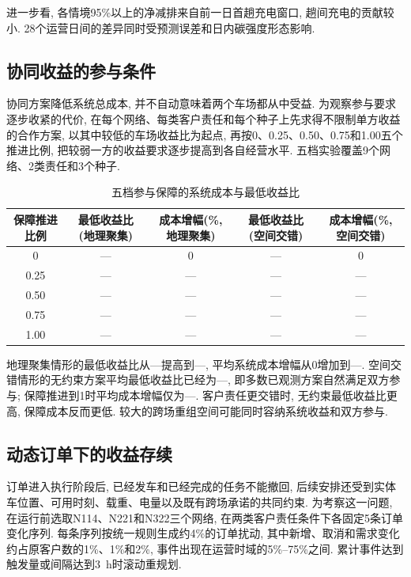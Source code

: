\documentclass{setp-new}
\newcommand{\setptabsetup}{\fontsize{9pt}{10.5pt}\selectfont\renewcommand{\arraystretch}{0.90}\setlength{\tabcolsep}{2.2pt}\setlength{\aboverulesep}{0.4pt}\setlength{\belowrulesep}{0.4pt}\hbadness=10000}
\begin{document}
进一步看, 各情境95\%以上的净减排来自前一日首趟充电窗口,
趟间充电的贡献较小.
28个运营日间的差异同时受预测误差和日内碳强度形态影响.

\subsection{协同收益的参与条件}

协同方案降低系统总成本, 并不自动意味着两个车场都从中受益.
为观察参与要求逐步收紧的代价,
在每个网络、每类客户责任和每个种子上先求得不限制单方收益的合作方案,
以其中较低的车场收益比为起点,
再按0、0.25、0.50、0.75和1.00五个推进比例,
把较弱一方的收益要求逐步提高到各自经营水平.
五档实验覆盖9个网络、2类责任和3个种子.

\begin{table}[H]
\centering
\caption{五档参与保障的系统成本与最低收益比}
\label{tab:fairness-frontier}
\setptabsetup
\begin{tabular}{@{}ccccc@{}}
\toprule
保障推进比例 & 最低收益比(地理聚集) & 成本增幅(\%, 地理聚集) & 最低收益比(空间交错) & 成本增幅(\%, 空间交错)\\
\midrule
0    & --- & 0 & --- & 0\\
0.25 & --- & --- & --- & ---\\
0.50 & --- & --- & --- & ---\\
0.75 & --- & --- & --- & ---\\
1.00 & --- & --- & --- & ---\\
\bottomrule
\end{tabular}
\end{table}

地理聚集情形的最低收益比从---提高到---,
平均系统成本增幅从0增加到---.
空间交错情形的无约束方案平均最低收益比已经为---,
即多数已观测方案自然满足双方参与;
保障推进到1时平均成本增幅仅为---.
客户责任更交错时, 无约束最低收益比更高, 保障成本反而更低.
较大的跨场重组空间可能同时容纳系统收益和双方参与.

\subsection{动态订单下的收益存续}

订单进入执行阶段后, 已经发车和已经完成的任务不能撤回,
后续安排还受到实体车位置、可用时刻、载重、电量以及既有跨场承诺的共同约束.
为考察这一问题, 在运行前选取N114、N221和N322三个网络,
在两类客户责任条件下各固定5条订单变化序列.
每条序列按统一规则生成约4\%的订单扰动,
其中新增、取消和需求变化约占原客户数的1\%、1\%和2\%,
事件出现在运营时域的5\%--75\%之间.
累计事件达到触发量或间隔达到3~h时滚动重规划.
\end{document}

